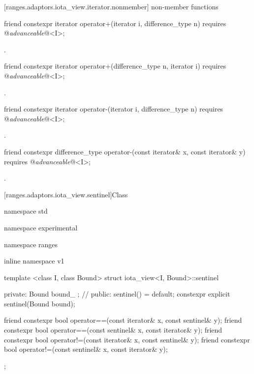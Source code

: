 [ranges.adaptors.iota_view.iterator.nonmember]{ non-member functions}

\begin{itemdecl}
friend constexpr iterator operator+(iterator i, difference_type n)
requires @\textit{advanceable}@<I>;
\end{itemdecl}

\begin{itemdescr}
\pnum
\returns {}.
\end{itemdescr}

\begin{itemdecl}
friend constexpr iterator operator+(difference_type n, iterator i)
requires @\textit{advanceable}@<I>;
\end{itemdecl}

\begin{itemdescr}
\pnum
\returns {}.
\end{itemdescr}

\begin{itemdecl}
friend constexpr iterator operator-(iterator i, difference_type n)
requires @\textit{advanceable}@<I>;
\end{itemdecl}

\begin{itemdescr}
\pnum
\returns {}.
\end{itemdescr}

\begin{itemdecl}
friend constexpr difference_type operator-(const iterator& x, const iterator& y)
requires @\textit{advanceable}@<I>;
\end{itemdecl}

\begin{itemdescr}
\pnum
\returns {}.
\end{itemdescr}

[ranges.adaptors.iota_view.sentinel]{Class }

\begin{codeblock}
namespace std { namespace experimental { namespace ranges { inline namespace v1 {
  template <class I, class Bound>
  struct iota_view<I, Bound>::sentinel {
  private:
    Bound bound_ {}; // \expos
  public:
    sentinel() = default;
    constexpr explicit sentinel(Bound bound);

    friend constexpr bool operator==(const iterator& x, const sentinel& y);
    friend constexpr bool operator==(const sentinel& x, const iterator& y);
    friend constexpr bool operator!=(const iterator& x, const sentinel& y);
    friend constexpr bool operator!=(const sentinel& x, const iterator& y);
  };
}}}}
\end{codeblock}

